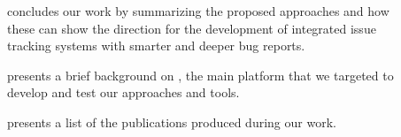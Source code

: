 \begin{description}
  \item[] concludes our work by summarizing the proposed approaches and how these can show the direction for the development of integrated issue tracking systems with smarter and deeper bug reports.

  \item[] presents a brief background on \pha, the main platform that we targeted to develop and test our approaches and tools.

  \item[] presents a list of the publications produced during our work.
\end{description}

